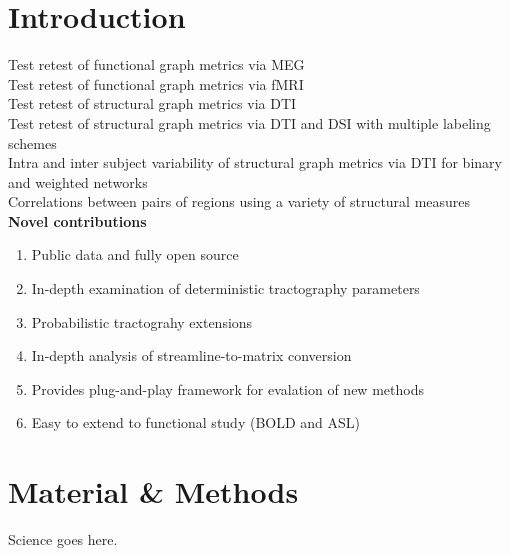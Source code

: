 \documentclass{frontiersSCNS} %
\begin{document}
\section{Introduction}

Test retest of functional graph metrics via MEG \cite{Deuker2009}\\
Test retest of functional graph metrics via fMRI \cite{Telesford2010}\\
Test retest of structural graph metrics via DTI \cite{Owen2013BC}\\ 
Test retest of structural graph metrics via DTI and DSI with multiple labeling schemes \cite{Bassett2011N}\\
Intra and inter subject variability of structural graph metrics via DTI for binary and weighted networks \cite{Cheng2012N}\\
Correlations between pairs of regions using a variety of structural measures \cite{Irimia2012N}\\

\textbf{Novel contributions}
\begin{enumerate}
\item Public data and fully open source
\item In-depth examination of deterministic tractography parameters
\item Probabilistic tractograhy extensions
\item In-depth analysis of streamline-to-matrix conversion
\item Provides plug-and-play framework for evalation of new methods
\item Easy to extend to functional study (BOLD and ASL) 
\end{enumerate}


\section{Material \& Methods}
Science goes here.\\
\end{document}
